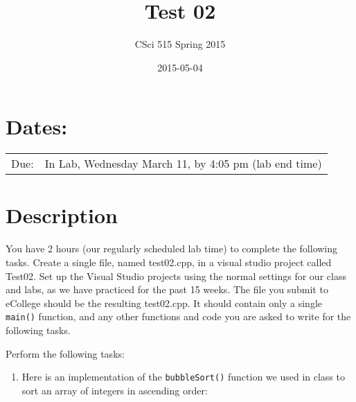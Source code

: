 \documentclass[11pt]{article}
\title{Test 02}
\author{CSci 515 Spring 2015}
\date{2015-05-04}
\begin{document}
\maketitle


\section*{Dates:}
\label{sec-1}


\begin{center}
\begin{tabular}{ll}
 Due:  &  In Lab, Wednesday March 11, by 4:05 pm (lab end time)  \\
\end{tabular}
\end{center}
\section*{Description}
\label{sec-2}

You have 2 hours (our regularly scheduled lab time) to complete the
following tasks.  Create a single file, named test02.cpp, in a visual
studio project called Test02.  Set up the Visual Studio projects using
the normal settings for our class and labs, as we have practiced for
the past 15 weeks.  The file you submit to eCollege should be the
resulting test02.cpp.  It should contain only a single \verb~main()~
function, and any other functions and code you are asked to write for
the following tasks.

Perform the following tasks:

\begin{enumerate}
\item Here is an implementation of the \verb~bubbleSort()~ function we
   used in class to sort an array of integers in ascending
   order:
\end{enumerate}
\end{document}
